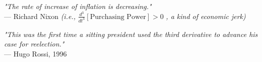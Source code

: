 \begin{flushright}
\emph{"The rate of increase of inflation is decreasing."}\\
— Richard Nixon \quad \textit{(i.e., } $\frac{d^3}{dt^3}[\text{Purchasing Power}] > 0$ \textit{, a kind of economic jerk)}
\end{flushright}

\begin{flushright}
\emph{"This was the first time a sitting president used the third derivative to advance his case for reelection."}\\
— Hugo Rossi, 1996
\end{flushright}
